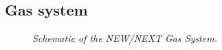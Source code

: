 %


%


\subsection{Gas system}

\begin{figure}[hpt!]
    \bigskip
    \begin{center}\leavevmode
        \caption{\textit{Schematic of the NEW/NEXT Gas System.}}
        \label{fig.GasSystem}
    \end{center}
\end{figure}

